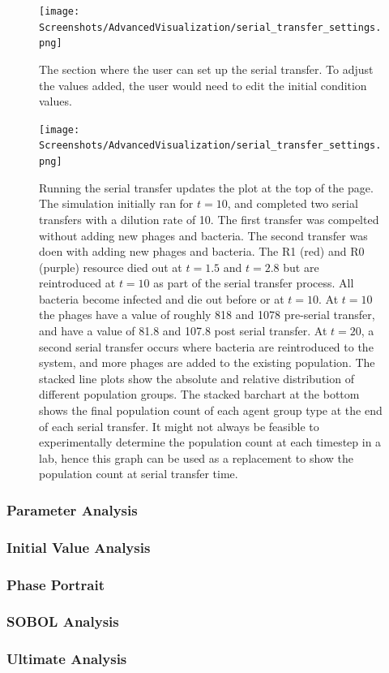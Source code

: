 \begin{figure}
    \centering
    \texttt{[image: Screenshots/AdvancedVisualization/serial\_transfer\_settings.png]}
    \caption{
        The section where the user can set up the serial transfer. To adjust the values added, the user would need to edit the initial condition values. 
    }
    \label{fig:ss:av:serial_transfer_settings}
\end{figure}
\begin{figure}
    \centering
    \texttt{[image: Screenshots/AdvancedVisualization/serial\_transfer\_settings.png]}
    \caption{
        Running the serial transfer updates the plot at the top of the page. The simulation initially ran for $t=10$, and completed two serial transfers with a dilution rate of 10. The first transfer was compelted without adding new phages and bacteria. The second transfer was doen with adding new phages and bacteria. 
        The R1 (red) and R0 (purple) resource died out at $t=1.5$ and $t=2.8$ but are reintroduced at $t=10$ as part of the serial transfer process. 
        All bacteria become infected and die out before or at $t=10$. 
        At $t=10$ the phages have a value of roughly 818 and 1078 pre-serial transfer, and have a value of 81.8 and 107.8 post serial transfer. 
        At $t=20$, a second serial transfer occurs where bacteria are reintroduced to the system, and more phages are added to the existing population. 
        The stacked line plots show the absolute and relative distribution of different population groups. 
        The stacked barchart at the bottom shows the final population count of each agent group type at the end of each serial transfer. 
        It might not always be feasible to experimentally determine the population count at each timestep in a lab, hence this graph can be used as a replacement to show the population count at serial transfer time. 
    }
    \label{fig:ss:av:serial_transfer_run2_with_p_b}
\end{figure}

\subsubsection{Parameter Analysis}
\subsubsection{Initial Value Analysis}
\subsubsection{Phase Portrait}
\subsubsection{SOBOL Analysis}
\subsubsection{Ultimate Analysis}